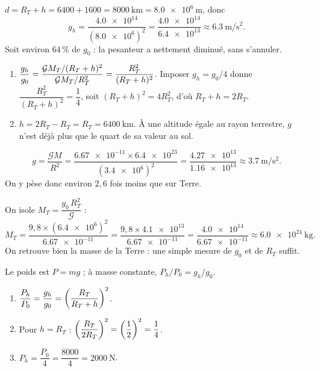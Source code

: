 \documentclass[11pt,a4paper]{article}
\begin{document}

\begin{corrige}
$d=R_T+h=6400+1600=\qty{8000}{\kilo\metre}=\qty{8.0e6}{\metre}$, donc
\[
g_h=\frac{\num{4.0e14}}{(\num{8.0e6})^2}=\frac{\num{4.0e14}}{\num{6.4e13}}
\approx\qty{6.3}{\metre\per\second\squared}.
\]
Soit environ $64\,\%$ de $g_0$ : la pesanteur a nettement diminué, sans s'annuler.
\end{corrige}

\begin{corrige}
\begin{enumerate}[label=\alph*)]
  \item $\displaystyle \frac{g_h}{g_0}=\frac{\mathcal{G}M_T/(R_T+h)^2}{\mathcal{G}M_T/R_T^2}
        =\frac{R_T^2}{(R_T+h)^2}$. Imposer $g_h=g_0/4$ donne
        $\dfrac{R_T^2}{(R_T+h)^2}=\dfrac14$, soit $(R_T+h)^2=4R_T^2$, d'où $R_T+h=2R_T$.
  \item $h=2R_T-R_T=R_T=\qty{6400}{\kilo\metre}$. À une altitude égale au rayon
        terrestre, $g$ n'est déjà plus que le quart de sa valeur au sol.
\end{enumerate}
\end{corrige}

\begin{corrige}
\[
g=\frac{\mathcal{G}M}{R^2}
 =\frac{\num{6.67e-11}\times\num{6.4e23}}{(\num{3.4e6})^2}
 =\frac{\num{4.27e13}}{\num{1.16e13}}\approx\qty{3.7}{\metre\per\second\squared}.
\]
On y pèse donc environ $2{,}6$ fois moins que sur Terre.
\end{corrige}

\begin{corrige}
On isole $M_T=\dfrac{g_0\,R_T^2}{\mathcal{G}}$ :
\[
M_T=\frac{9{,}8\times(\num{6.4e6})^2}{\num{6.67e-11}}
   =\frac{9{,}8\times\num{4.1e13}}{\num{6.67e-11}}
   =\frac{\num{4.0e14}}{\num{6.67e-11}}\approx\qty{6.0e24}{\kilogram}.
\]
On retrouve bien la masse de la Terre : une simple mesure de $g_0$ et de $R_T$ suffit.
\end{corrige}

\begin{corrige}
Le poids est $P=mg$ ; à masse constante, $P_h/P_0=g_h/g_0$.
\begin{enumerate}[label=\alph*)]
  \item $\displaystyle \frac{P_h}{P_0}=\frac{g_h}{g_0}=\left(\frac{R_T}{R_T+h}\right)^2$.
  \item Pour $h=R_T$ : $\displaystyle \left(\frac{R_T}{2R_T}\right)^2=\left(\frac12\right)^2=\frac14$.
  \item $P_h=\dfrac{P_0}{4}=\dfrac{8000}{4}=\qty{2000}{\newton}$.
\end{enumerate}
\end{corrige}
\end{document}
